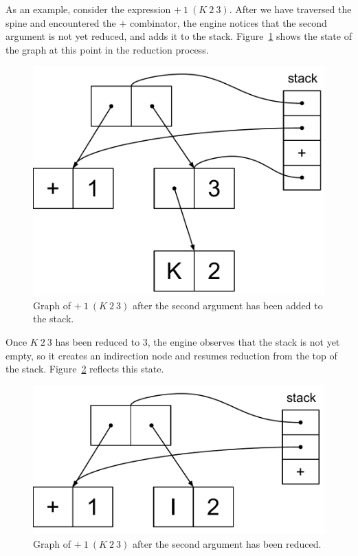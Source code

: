 \documentclass[conference]{IEEEtran}
\begin{document}
As an example, consider the expression $+ \ 1 \ (K \ 2 \ 3)$.
After we have traversed the spine and encountered the $+$ combinator, the engine notices that the second argument is not yet reduced, and adds it to the stack.
Figure~\ref{fig:add_step1} shows the state of the graph at this point in the reduction process.

\begin{figure}
    \includegraphics[width=.8\columnwidth]{add_step1}
    \centering
    \caption{
        Graph of $+ \ 1 \ (K \ 2 \ 3)$ after the second argument has been added to the stack.
    }
    \label{fig:add_step1}
\end{figure}

Once $K \ 2 \ 3$ has been reduced to $3$, the engine observes that the stack is not yet empty, so it creates an indirection node and resumes reduction from the top of the stack.
Figure~\ref{fig:add_step2} reflects this state.

\begin{figure}
    \includegraphics[width=.8\columnwidth]{add_step2}
    \centering
    \caption{
        Graph of $+ \ 1 \ (K \ 2 \ 3)$ after the second argument has been reduced.
    }
    \label{fig:add_step2}
\end{figure}
\end{document}

